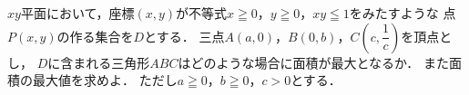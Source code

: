 \documentclass[../../main.tex]{subfiles}
\begin{document}
$xy$平面において，座標$(x,y)$が不等式$x\geqq0$，$y\geqq0$，$xy\leqq1$をみたすような
点$P(x,y)$の作る集合を$D$とする．
三点$A(a,0)$，$B(0,b)$，$\displaystyle C \left( c,\dfrac{1}{c} \right)$を頂点とし，
$D$に含まれる三角形$ABC$はどのような場合に面積が最大となるか．
また面積の最大値を求めよ．
ただし$a\geqq0$，$b\geqq0$，$c>0$とする．
\end{document}
